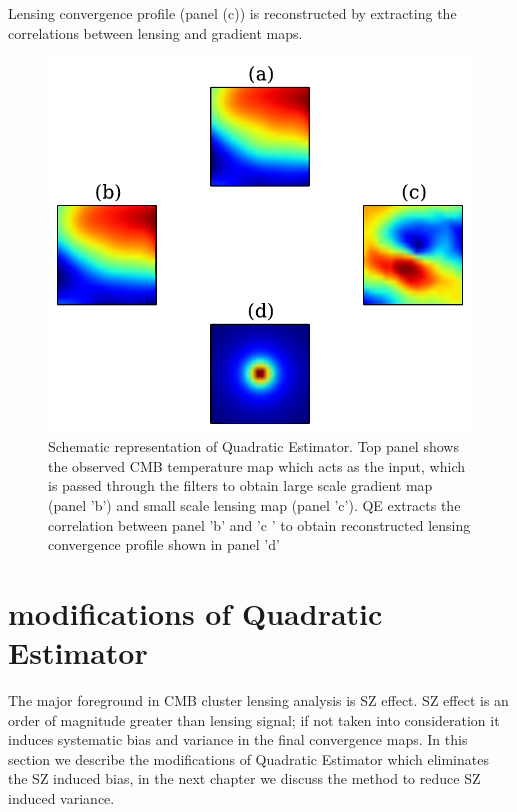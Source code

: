 Lensing convergence profile (panel (c)) is reconstructed by extracting the correlations between lensing and gradient maps.
 \begin{figure}[H]
\includegraphics[width=\linewidth]{figs/QE_schem.pdf}
\caption{Schematic representation of Quadratic Estimator. Top panel shows the observed CMB temperature map which acts as the input, which is passed through the filters to obtain large scale gradient map (panel 'b') and small scale lensing map (panel 'c'). QE extracts the correlation between panel 'b' and 'c ' to obtain reconstructed lensing convergence profile shown in panel 'd'}
\label{fig:QE_schem}
\end{figure}
 
\section{modifications of Quadratic Estimator}
The major foreground in CMB cluster lensing analysis is SZ effect.
SZ effect is an order of magnitude greater than lensing signal; if not taken into consideration it induces systematic bias and variance in the final convergence maps.
In this section we describe the modifications of Quadratic Estimator which eliminates the SZ induced bias, in the next chapter we discuss the method to reduce SZ induced variance.


